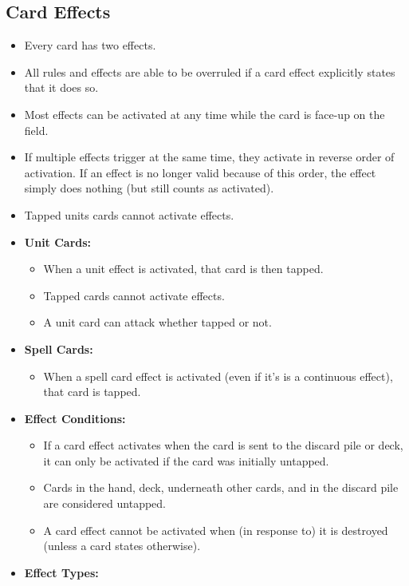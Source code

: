 \subsection{Card Effects}
\begin{itemize}
    \item Every card has two effects.
    \item All rules and effects are able to be overruled if a card effect explicitly states that it does so.
    \item Most effects can be activated at any time while the card is face-up on the field.
    \item If multiple effects trigger at the same time, they activate in reverse order of activation. If an effect is no longer valid because of this order, the effect simply does nothing (but still counts as activated).
    \item Tapped units cards cannot activate effects.
    \item \textbf{Unit Cards:}
    \begin{itemize}
        \item When a unit effect is activated, that card is then tapped.
        \item Tapped cards cannot activate effects.
        \item A unit card can attack whether tapped or not.
    \end{itemize}
    \item \textbf{Spell Cards:}
    \begin{itemize}
        \item When a spell card effect is activated (even if it's is a continuous effect), that card is tapped.
    \end{itemize}
    \item \textbf{Effect Conditions:}
    \begin{itemize}
        \item If a card effect activates when the card is sent to the discard pile or deck, it can only be activated if the card was initially untapped.
        \item Cards in the hand, deck, underneath other cards, and in the discard pile are considered untapped.
        \item A card effect cannot be activated when (in response to) it is destroyed (unless a card states otherwise).
    \end{itemize}
    \item \textbf{Effect Types:}
    \begin{itemize}

\end{itemize}
\end{itemize}
